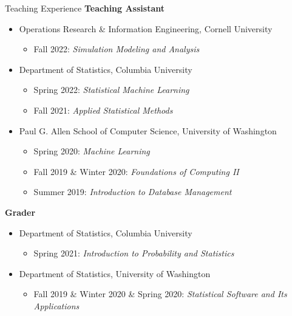 \documentclass{resume} %
\begin{document}
\begin{rSection}{Teaching Experience}
{\bf Teaching Assistant}
\begin{itemize}
\item Operations Research \& Information Engineering, Cornell University
\begin{itemize}
\item Fall 2022: {\em Simulation Modeling and Analysis}
\end{itemize}
\item Department of Statistics, Columbia University
\begin{itemize}
\item Spring 2022: {\em Statistical Machine Learning}
\item Fall 2021: {\em Applied Statistical Methods}
\end{itemize}
\item Paul G. Allen School of Computer Science, University of Washington
\begin{itemize}
\item Spring 2020: {\em Machine Learning}
\item Fall 2019 \& Winter 2020: {\em Foundations of Computing II}
\item Summer 2019: {\em Introduction to Database Management}
\end{itemize}
\end{itemize}
{\bf Grader}
\begin{itemize}
\item Department of Statistics, Columbia University
\begin{itemize}
\item Spring 2021: {\em Introduction to Probability and Statistics}
\end{itemize}
\item Department of Statistics, University of Washington
\begin{itemize}
\item Fall 2019 \& Winter 2020 \& Spring 2020: {\em Statistical Software and Its Applications}
\end{itemize}
\end{itemize}
\end{rSection}




\end{document}
